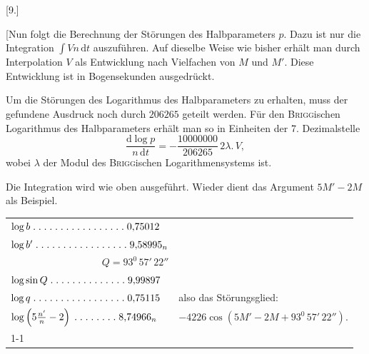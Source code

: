 \clearpage
\begin{landscape}
\begingroup
\fontsize{10}{13}\selectfont
{}
\renewcommand{\headrulewidth}{0pt}
\begin{center}[9.]\end{center}
\par\noindent\hspace*{\parindent}[Nun folgt die Berechnung der Störungen des Halbparameters \(p\). Dazu ist nur die Integration \(\int Vn\,\mathrm{d}t\) auszuführen. Auf dieselbe Weise wie bisher erhält man durch Interpolation \(V\) als Entwicklung nach Vielfachen von \(M\) und \(M'\). Diese Entwicklung ist in Bogensekunden ausgedrückt.
\par\noindent\hspace*{\parindent}Um die Störungen des Logarithmus des Halbparameters zu erhalten, muss der gefundene Ausdruck noch durch \(206265\) geteilt werden. Für den \textsc{Brigg}ischen Logarithmus des Halbparameters erhält man so in Einheiten der 7. Dezimalstelle
\[
\frac{\mathrm{d}\log p}{n\,\mathrm{d}t}=-\frac{10000000}{206265}\,2\lambda\mathord{.}\,V,
\]
\noindent wobei \(\lambda\) der Modul des \textsc{Brigg}ischen Logarithmensystems ist.
\par\noindent\hspace*{\parindent}Die Integration wird wie oben ausgeführt. Wieder dient das Argument \(5M'-2M\) als Beispiel.
\begingroup
\newcommand{\VNinePoint}{\mathord{.}\mkern5mu}
\newcommand{\VNineFive}{\VNinePoint\VNinePoint\VNinePoint\VNinePoint\VNinePoint}
\begin{center}
\begin{tabular}{@{}l@{\quad}l@{}}
\(\log b\;\VNineFive\VNineFive\VNineFive\VNinePoint\VNinePoint0{,}75012\)&\\
\(\log b'\;\VNineFive\VNineFive\VNineFive\VNinePoint\VNinePoint9{,}58995_n\)&\\
\multicolumn{1}{r}{\(Q=93^0\,57'\,22''\)}&\\
\(\log\sin Q\;\VNineFive\VNineFive\VNinePoint\VNinePoint\VNinePoint\VNinePoint9{,}99897\)&\\
\(\log q\;\VNineFive\VNineFive\VNineFive\VNinePoint\VNinePoint0{,}75115\)&also das Störungsglied:\\
\(\log\left(5\frac{n'}{n}-2\right)\;\VNineFive\VNinePoint\VNinePoint\VNinePoint8{,}74966_n\)&\(-4226\cos(5M'-2M+93^0\,57'\,22'').\)\\
\cline{1-1}
\multicolumn{1}{r}{\(2{,}00149_n\)}&\\[3pt]

\end{tabular}
\end{center}
\end{landscape}
